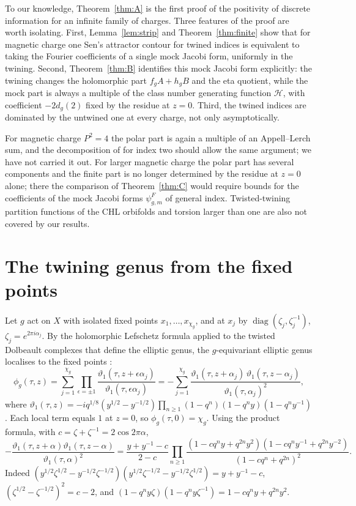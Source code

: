 \documentclass[11pt]{amsart}
\theoremstyle{definition}
\newcommand{\vt}{\vartheta}
\newcommand{\cH}{\mathcal H}
\begin{document}
To our knowledge, Theorem~\ref{thm:A} is the first proof of the positivity of discrete information for an infinite family of charges. Three features of the proof are worth isolating. First, Lemma~\ref{lem:strip} and Theorem~\ref{thm:finite} show that for magnetic charge one Sen's attractor contour for twined indices is equivalent to taking the Fourier coefficients of a single mock Jacobi form, uniformly in the twining. Second, Theorem~\ref{thm:B} identifies this mock Jacobi form explicitly: the twining changes the holomorphic part $f_gA+h_gB$ and the eta quotient, while the mock part is always a multiple of the class number generating function $\cH$, with coefficient $-2d_g(2)$ fixed by the residue at $z=0$. Third, the twined indices are dominated by the untwined one at every charge, not only asymptotically.

For magnetic charge $P^2=4$ the polar part is again a multiple of an Appell--Lerch sum, and the decomposition of \cite{BM13} for index two should allow the same argument; we have not carried it out. For larger magnetic charge the polar part has several components and the finite part is no longer determined by the residue at $z=0$ alone; there the comparison of Theorem~\ref{thm:C} would require bounds for the coefficients of the mock Jacobi forms $\psi^F_{g,m}$ of general index. Twisted-twining partition functions of the CHL orbifolds \cite{GSSV23} and torsion larger than one are also not covered by our results.

\appendix

\section{The twining genus from the fixed points}\label{app:genus}

Let $g$ act on $X$ with isolated fixed points $x_1,\dots,x_{\chi_g}$, and at $x_j$ by $\operatorname{diag}(\zeta_j,\zeta_j^{-1})$, $\zeta_j=e^{2\pi i\alpha_j}$. By the holomorphic Lefschetz formula applied to the twisted Dolbeault complexes that define the elliptic genus, the $g$-equivariant elliptic genus localises to the fixed points \cite{BL00,HBJ92}:
\[
\phi_g(\tau,z)=\sum_{j=1}^{\chi_g}\prod_{\epsilon=\pm1}\frac{\vt_1(\tau,z+\epsilon\alpha_j)}{\vt_1(\tau,\epsilon\alpha_j)}=-\sum_{j=1}^{\chi_g}\frac{\vt_1(\tau,z+\alpha_j)\,\vt_1(\tau,z-\alpha_j)}{\vt_1(\tau,\alpha_j)^2},
\]
where $\vt_1(\tau,z)=-iq^{1/8}(y^{1/2}-y^{-1/2})\prod_{n\ge1}(1-q^n)(1-q^ny)(1-q^ny^{-1})$. Each local term equals $1$ at $z=0$, so $\phi_g(\tau,0)=\chi_g$. Using the product formula, with $c=\zeta+\zeta^{-1}=2\cos2\pi\alpha$,
\begin{equation}\label{eq:local}
-\frac{\vt_1(\tau,z+\alpha)\vt_1(\tau,z-\alpha)}{\vt_1(\tau,\alpha)^2}=\frac{y+y^{-1}-c}{2-c}\prod_{n\ge1}\frac{(1-cq^ny+q^{2n}y^2)(1-cq^ny^{-1}+q^{2n}y^{-2})}{(1-cq^n+q^{2n})^2}.
\end{equation}
Indeed $(y^{1/2}\zeta^{1/2}-y^{-1/2}\zeta^{-1/2})(y^{1/2}\zeta^{-1/2}-y^{-1/2}\zeta^{1/2})=y+y^{-1}-c$, $(\zeta^{1/2}-\zeta^{-1/2})^2=c-2$, and $(1-q^ny\zeta)(1-q^ny\zeta^{-1})=1-cq^ny+q^{2n}y^2$.
\end{document}
